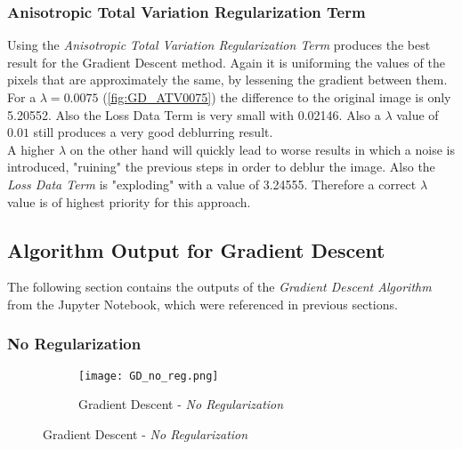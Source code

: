 \documentclass{report}
\begin{document}
			\subsubsection{Anisotropic Total Variation Regularization Term}
			\startsubsection
				Using the \textit{Anisotropic Total Variation Regularization Term} produces the best result for the Gradient Descent method. Again it is uniforming the values of the pixels that are approximately the same, by lessening the gradient between them. For a $\lambda = 0.0075$ (\ref{fig:GD_ATV0075}) the difference to the original image is only 5.20552. Also the Loss Data Term is very small with 0.02146. Also a $\lambda$ value of $0.01$ still produces a very good deblurring result. \\
				A higher $\lambda$ on the other hand will quickly lead to worse results in which a noise is introduced, "ruining" the previous steps in order to deblur the image. Also the \textit{Loss Data Term} is "exploding" with a value of 3.24555. Therefore a correct $\lambda$ value is of highest priority for this approach.
			\closesection
		\closesection
		
		\newpage
		\subsection*{Algorithm Output for Gradient Descent}
		\startsubsection
			The following section contains the outputs of the \textit{Gradient Descent Algorithm} from the Jupyter Notebook, which were referenced in previous sections.
			\subsubsection*{No Regularization}
			\begin{figure}[H] \renewcommand\thesubfigure{GD.NR}
				\centering
				\begin{subfigure}[b]{0.7\textwidth}
					\texttt{[image: GD\_no\_reg.png]}
					\caption{Gradient Descent - \textit{No Regularization}}
					\label{fig:GD_NR}
				\end{subfigure}
			\end{figure}
\end{document}

